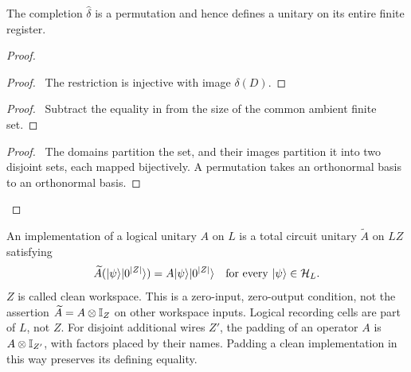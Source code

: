 \begin{lemma}\label{lem:completion}
The completion $\widehat\delta$ is a permutation and hence defines a
unitary on its entire finite register.
\end{lemma}
\begin{proof}
 \begin{proof}\pf\ The restriction is injective with image $\delta(D)$.
 \end{proof}
 \begin{proof}\pf\ Subtract the equality in  from
 the size of the common ambient finite set.\end{proof}
 \qedstep
 \begin{proof}\pf\ The domains partition the set, and their images
 partition it into two disjoint sets, each mapped bijectively. A
 permutation takes an orthonormal basis to an orthonormal basis.\end{proof}
\end{proof}

\begin{definition}\label{def:scratch}
An implementation of a logical unitary $A$ on $L$ is a total circuit
unitary $\widetilde A$ on $LZ$ satisfying
\[
 \widetilde A(\lvert \psi\rangle\lvert 0^{|Z|}\rangle)=
 A\lvert \psi\rangle\lvert 0^{|Z|}\rangle\quad\hbox{for every }\lvert \psi\rangle\in\mathcal{H}_L.
\]
$Z$ is called clean workspace. This is a zero-input, zero-output
condition, not the assertion $\widetilde A=A\otimes\mathbb{I}_Z$ on other
workspace inputs. Logical recording cells are part of $L$, not $Z$.
For disjoint additional wires $Z'$, the padding of an operator $A$ is
$A\otimes\mathbb{I}_{Z'}$, with factors placed by their names. Padding a
clean implementation in this way preserves its defining equality.
\end{definition}

